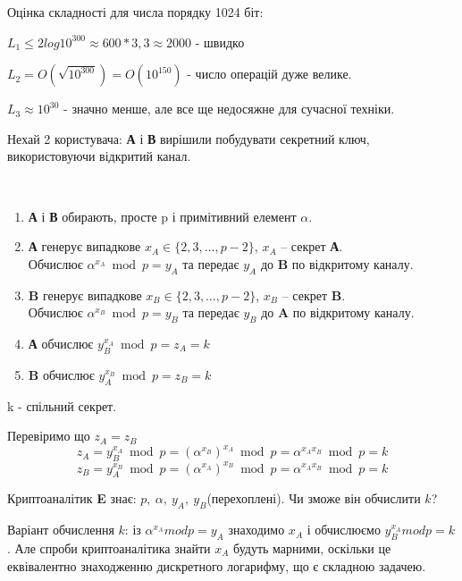 \begin{example}Оцінка складності для числа порядку 1024 біт:

$L_1  \leq 2log10^{300}\approx 600 * 3,3 \approx 2000$ - швидко

$L_2 = O(\sqrt{10^{300}}) = O(10^{150})$ - число операцій дуже велике.

$L_3 \approx 10^{30}$ - значно менше, але все ще недосяжне для сучасної техніки.
\end{example}

Нехай 2 користувача: \textbf{А} і \textbf{В} вирішили побудувати секретний ключ, використовуючи відкритий канал.

\begin{algorithm}\

\begin{enumerate}

\item \textbf{А} і \textbf{В} обирають, просте p і примітивний елемент $\alpha$.

\item \textbf{А} генерує випадкове $x_A \in \{2,3, \dots, p-2\}$, $x_A$  – секрет \textbf{А}.\\
Обчислює $\alpha ^{x_A} \bmod p = y_A$ та передає $y_A$ до \textbf{B} по відкритому каналу.

\item \textbf{B} генерує випадкове $x_B \in \{2,3, \dots, p-2\}$, $x_B$  – секрет \textbf{B}.\\
Обчислює $\alpha ^{x_B} \bmod p = y_B$ та передає $y_B$ до \textbf{A} по відкритому каналу.

\item \textbf{А} обчислює $y_B^{x_A} \bmod p = z_A = k$

\item \textbf{B} обчислює $y_A^{x_B} \bmod p = z_B = k$
\end{enumerate}
k - спільний секрет.

\end{algorithm}
Перевіримо що $z_A=z_B$
\[ z_A = y_B^{x_A} \bmod p = (\alpha ^{x_B})^{x_A} \bmod p = \alpha ^{x_Ax_B} \bmod p = k \]
\[ z_B = y_A^{x_B} \bmod p = (\alpha ^{x_A})^{x_B} \bmod p = \alpha ^{x_Ax_B} \bmod p = k \]

Криптоаналітик \textbf{E} знає: $p,\ \alpha,\ y_A,\ y_B$(перехоплені). Чи зможе він обчислити $k$?

Варіант обчислення $k$: із $\alpha ^{x_A} mod p = y_A $ знаходимо $x_A$ і обчислюємо $y_B^{x_A} mod p = k$.
Але спроби криптоаналітика знайти $x_A$ будуть марними, оскільки це еквівалентно знаходженню дискретного логарифму, що є складною задачею.

